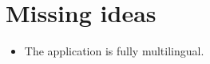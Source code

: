 \documentclass{sig-alternate-05-2015}
\begin{document}
{\color{red}
\section{Missing ideas}
\begin{itemize}
\item The application is fully multilingual.
\end{itemize}

\begin{comment}
\section{Title ideas}
\begin{itemize}
\item YouUnderstood.me?
\item YouUnderstood.me? Academic material retrieval for students and educators
\item YouUnderstood.me? A readability filtered material searcher for students and educators
\item  YouUnderstood.me? Making sure student s and educators understand each other
\item  YouUnderstood.me? Making students and educators understand each other
\end{itemize}
\end{comment}
}


{}

\nocite{*}
\end{document}
